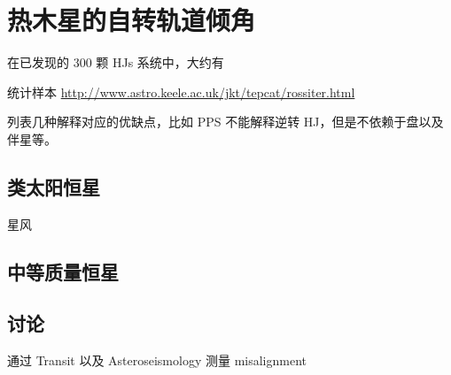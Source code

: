 \section{热木星的自转轨道倾角} 

在已发现的 300 颗 HJs 系统中，大约有 

统计样本
\url{http://www.astro.keele.ac.uk/jkt/tepcat/rossiter.html}



列表几种解释对应的优缺点，比如 PPS 不能解释逆转 HJ，但是不依赖于盘以及伴星等。

\subsection{类太阳恒星}

星风

\subsection{中等质量恒星}

\subsection{讨论}


通过 Transit 以及 Asteroseismology 测量 misalignment 



